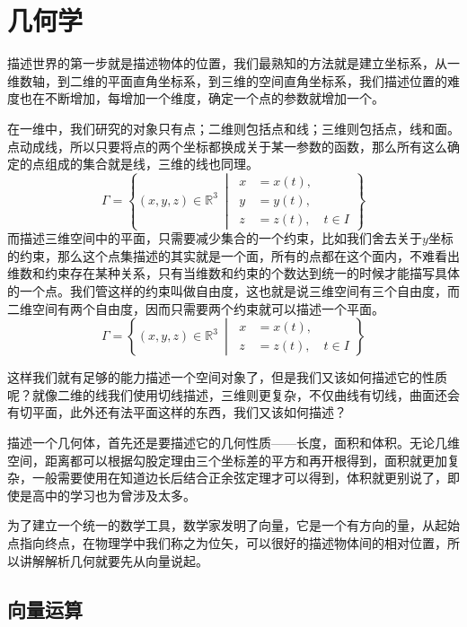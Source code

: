 \documentclass[UTF8]{ctexbook}
\begin{document}
\tableofcontents



\chapter{几何学}



描述世界的第一步就是描述物体的位置，我们最熟知的方法就是建立坐标系，从一维数轴，到二维的平面直角坐标系，到三维的空间直角坐标系，我们描述位置的难度也在不断增加，每增加一个维度，确定一个点的参数就增加一个。

在一维中，我们研究的对象只有点；二维则包括点和线；三维则包括点，线和面。点动成线，所以只要将点的两个坐标都换成关于某一参数的函数，那么所有这么确定的点组成的集合就是线，三维的线也同理。
\[
\Gamma=\left\{(x,y,z)\in\mathbb{R}^3\ \middle|\
\begin{aligned}
x&=x(t),\\
y&=y(t),\\
z&=z(t),\quad t\in I
\end{aligned}
\right\}
\]
而描述三维空间中的平面，只需要减少集合的一个约束，比如我们舍去关于$y$坐标的约束，那么这个点集描述的其实就是一个面，所有的点都在这个面内，不难看出维数和约束存在某种关系，只有当维数和约束的个数达到统一的时候才能描写具体的一个点。我们管这样的约束叫做自由度，这也就是说三维空间有三个自由度，而二维空间有两个自由度，因而只需要两个约束就可以描述一个平面。
\[
\Gamma=\left\{(x,y,z)\in\mathbb{R}^3\ \middle|\
\begin{aligned}
x&=x(t),\\
z&=z(t),\quad t\in I
\end{aligned}
\right\}
\]

这样我们就有足够的能力描述一个空间对象了，但是我们又该如何描述它的性质呢？就像二维的线我们使用切线描述，三维则更复杂，不仅曲线有切线，曲面还会有切平面，此外还有法平面这样的东西，我们又该如何描述？

描述一个几何体，首先还是要描述它的几何性质——长度，面积和体积。无论几维空间，距离都可以根据勾股定理由三个坐标差的平方和再开根得到，面积就更加复杂，一般需要使用在知道边长后结合正余弦定理才可以得到，体积就更别说了，即使是高中的学习也为曾涉及太多。

为了建立一个统一的数学工具，数学家发明了向量，它是一个有方向的量，从起始点指向终点，在物理学中我们称之为位矢，可以很好的描述物体间的相对位置，所以讲解解析几何就要先从向量说起。

\newpage

\section{向量运算}
\end{document}
